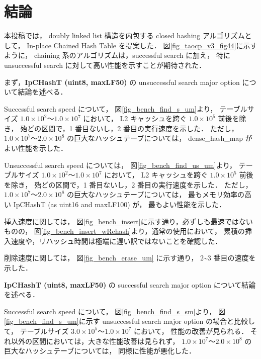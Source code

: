 \chapter{結論}
\label{chap_Conclusion}


本投稿では，
doubly linked list 構造を内包する closed hashing アルゴリズムとして，
In-place Chained Hash Table を提案した．
図\ref{fig_taocp_v3_fig44}に示すように，
chaining 系のアルゴリズムは，successful search に加え，
特に unsuccessful search に対して高い性能を示すことが期待された．
\newline

まず，{\bf IpCHashT (uint8, maxLF50)} の unsuccessful search major option について結論を述べる．

Successful search speed について，
図\ref{fig_bench_find_s_um}より，
テーブルサイズ $1.0\times10^2〜1.0\times10^7$ において，
L2 キャッシュを跨ぐ $1.0\times10^5$ 前後を除き，
殆どの区間で，1 番目ないし，2 番目の実行速度を示した．
ただし，$1.0\times10^7〜2.0\times10^8$ の巨大なハッシュテーブについては，
dense\_hash\_map がよい性能を示した．

Unsuccessful search speed については，
図\ref{fig_bench_find_us_um}より，
テーブルサイズ $1.0\times10^2〜1.0\times10^7$ において，
L2 キャッシュを跨ぐ $1.0\times10^5$ 前後を除き，
殆どの区間で，1 番目ないし，2 番目の実行速度を示した．
ただし，$1.0\times10^7〜2.0\times10^8$ の巨大なハッシュテーブについては，
最もメモリ効率の高い IpCHashT (as uint16 and maxLF100) が，
最もよい性能を示した．

挿入速度に関しては，
図\ref{fig_bench_insert}に示す通り，必ずしも最速ではないものの，
図\ref{fig_bench_insert_wRehash}より，通常の使用において，
累積の挿入速度や，リハッシュ時間は極端に遅い訳ではないことを確認した．

削除速度に関しては，
図\ref{fig_bench_erase_um} に示す通り，
2\textasciitilde 3 番目の速度を示した．
\newline

{\bf IpCHashT (uint8, maxLF50)} の successful search major option について結論を述べる．

Successful search speed について，
図\ref{fig_bench_find_s_sm}より，
図\ref{fig_bench_find_s_um}に示す unsuccessful search major option の場合と比較して，
テーブルサイズ $3.0\times10^5〜1.0\times10^7$ において，
性能の改善が見られる．
それ以外の区間においては，大きな性能改善は見られず，
$1.0\times10^7〜2.0\times10^8$ の巨大なハッシュテーブについては，
同様に性能が悪化した．

